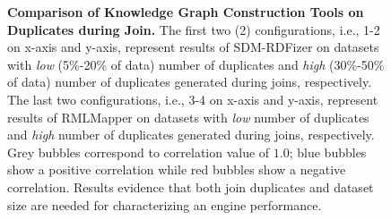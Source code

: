 \begin{figure}[!tb]
{      \label{fig:naive2}
    }
    \caption[Knowledge Graph Construction Tools on Duplicates during Join]{\textbf{Comparison of Knowledge Graph Construction Tools on Duplicates during Join.} The first two (2) configurations, i.e., 1-2 on x-axis and y-axis, represent results of SDM-RDFizer on datasets with \textit{low} (5\%-20\% of data) number of duplicates and \textit{high} (30\%-50\% of data) number of duplicates generated during joins, respectively. The last two configurations, i.e., 3-4 on x-axis and y-axis, represent results of RMLMapper on datasets with \textit{low} number of duplicates and \textit{high} number of duplicates generated during joins, respectively. Grey bubbles correspond to correlation value of $1.0$; blue bubbles show a positive correlation while red bubbles show a negative correlation. Results evidence that both join duplicates and dataset size are needed for characterizing an engine performance.}
    \label{fig:duplicates_bubble}
\end{figure}

